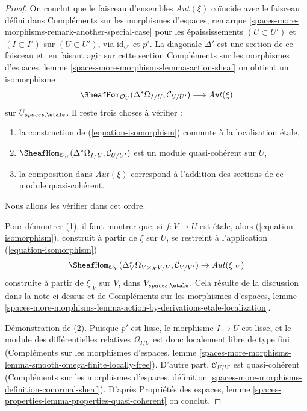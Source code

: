 \begin{proof}
\medskip\noindent
On conclut que le faisceau d'ensembles $\mathit{Aut}(\xi)$ coïncide avec
le faisceau défini dans
Compléments sur les morphismes d'espaces, remarque
\ref{spaces-more-morphisms-remark-another-special-case}
pour les épaississements $(U \subset U')$ et $(I \subset I')$ sur
$(U \subset U')$, via $\text{id}_{U'}$ et $p'$.
La diagonale $\Delta'$ est une section de ce faisceau et, en faisant
agir sur cette section Compléments sur les morphismes d'espaces, lemme
\ref{spaces-more-morphisms-lemma-action-sheaf}
on obtient un isomorphisme
\begin{equation}
\label{equation-isomorphism}
\SheafHom_{\mathcal{O}_U}(\Delta^*\Omega_{I/U}, \mathcal{C}_{U/U'})
\longrightarrow
\mathit{Aut}(\xi)
\end{equation}
sur $U_{spaces, \etale}$. Il reste trois choses à vérifier :
\begin{enumerate}
\item la construction de (\ref{equation-isomorphism})
commute à la localisation \'etale,
\item $\SheafHom_{\mathcal{O}_U}(\Delta^*\Omega_{I/U}, \mathcal{C}_{U/U'})$
est un module quasi-cohérent sur $U$,
\item la composition dans $\mathit{Aut}(\xi)$ correspond
à l'addition des sections de ce module quasi-cohérent.
\end{enumerate}
Nous allons les vérifier dans cet ordre.

\medskip\noindent
Pour démontrer (1), il faut montrer que, si $f : V \to U$ est \'etale,
alors (\ref{equation-isomorphism}), construit à partir de $\xi$ sur $U$,
se restreint à l'application (\ref{equation-isomorphism})
$$
\SheafHom_{\mathcal{O}_V}(
\Delta_V^*\Omega_{V \times_\mathcal{X} V/V}, \mathcal{C}_{V/V'}) \to
\mathit{Aut}(\xi|_V)
$$
construite à partir de $\xi|_V$ sur $V$, dans $V_{spaces, \etale}$.
Cela résulte de la discussion dans la note ci-dessus
et de Compléments sur les morphismes d'espaces, lemme
\ref{spaces-more-morphisms-lemma-action-by-derivations-etale-localization}.

\medskip\noindent
Démonstration de (2). Puisque $p'$ est lisse, le morphisme $I \to U$ est lisse,
et le module des différentielles relatives $\Omega_{I/U}$ est donc
localement libre de type fini (Compléments sur les morphismes d'espaces, lemme
\ref{spaces-more-morphisms-lemma-smooth-omega-finite-locally-free}).
D'autre part, $\mathcal{C}_{U/U'}$ est quasi-cohérent
(Compléments sur les morphismes d'espaces, définition
\ref{spaces-more-morphisms-definition-conormal-sheaf}).
D'après Propriétés des espaces, lemme
\ref{spaces-properties-lemma-properties-quasi-coherent}
on conclut.


\end{proof}
